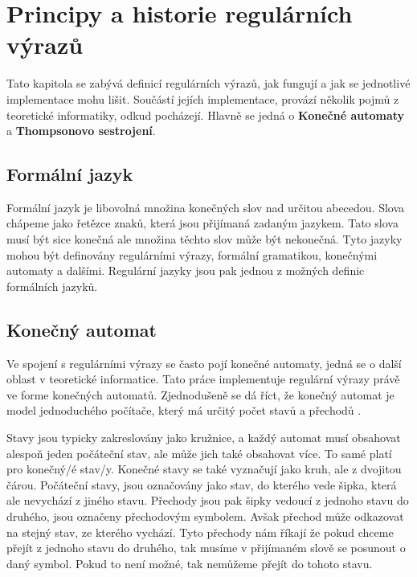 \chapter{Principy a historie regulárních výrazů}\label{sec:Principle}

Tato kapitola se zabývá definicí regulárních výrazů, jak fungují a jak se jednotlivé implementace mohu lišit. 
Součástí jejích implementace, provází několik pojmů z teoretické informatiky, odkud pocházejí.
Hlavně se jedná o \textbf{Konečné automaty} a \textbf{Thompsonovo sestrojení}.




\section{Formální jazyk}
Formální jazyk je libovolná množina konečných slov nad určitou abecedou. 
Slova chápeme jako řetězce znaků, která jsou přijímaná zadaným jazykem.
Tato slova musí být sice konečná ale množina těchto slov může být nekonečná. 
Tyto jazyky mohou být definovány regulárními výrazy, formální gramatikou,
konečnými automaty a dalšími. Regulární jazyky jsou pak jednou z možných definic formálních jazyků.

\section{Konečný automat}\label{sec:FiniteAutomaton}
Ve spojení s regulárními výrazy se často pojí konečné automaty, jedná se o další oblast v teoretické informatice.
Tato práce implementuje regulární výrazy právě ve forme konečných automatů.
Zjednodušeně se dá říct, že konečný automat je model jednoduchého počítače, který má určitý počet stavů a přechodů \cite{Havrlant}. 

Stavy jsou typicky zakreslovány jako kružnice, a každý automat musí obsahovat alespoň jeden počáteční stav, ale může jich také obsahovat více. 
To samé platí pro konečný/é stav/y. 
Konečné stavy se také vyznačují jako kruh, ale z dvojitou čárou. 
Počáteční stavy, jsou označovány jako stav, do kterého vede šipka, která ale nevychází z jiného stavu.
Přechody jsou pak šipky vedoucí z jednoho stavu do druhého, jsou označeny přechodovým symbolem.
Avšak přechod může odkazovat na stejný stav, ze kterého vychází.
Tyto přechody nám říkají že pokud chceme přejít z jednoho stavu do druhého, tak musíme v přijímaném slově se posunout o daný symbol. 
Pokud to není možné, tak nemůžeme přejít do tohoto stavu.

